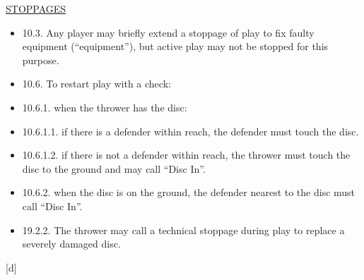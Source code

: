 \underline{\uppercase{stoppages}}
\begin{itemize}
    \item 10.3. Any player may briefly extend a stoppage of play to fix faulty equipment (“equipment”), but active play may not be stopped for this purpose.
    \item 10.6. To restart play with a check:
    \item 10.6.1. when the thrower has the disc:
    \item 10.6.1.1. if there is a defender within reach, the defender must touch the disc.
    \item 10.6.1.2. if there is not a defender within reach, the thrower must touch the disc to the ground and may call “Disc In”.
    \item 10.6.2. when the disc is on the ground, the defender nearest to the disc must call “Disc In”.
    \item 19.2.2. The thrower may call a technical stoppage during play to replace a severely damaged disc.
\end{itemize}
\begin{center}[d]\end{center}
